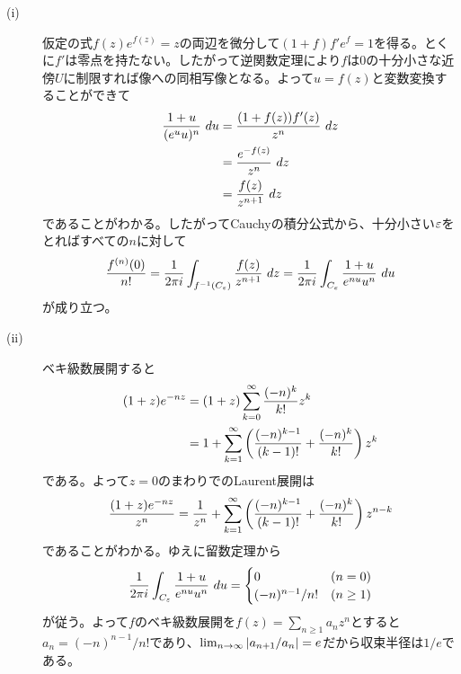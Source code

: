 \subsubsection{} %
\begin{sol} ${}$
  \begin{description}
    \item[(i)] 仮定の式$f(z)e^{f(z)} = z$の両辺を微分して$(1 + f)f' e^f = 1$を得る。とくに$f'$は零点を持たない。したがって逆関数定理により$f$は$0$の十分小さな近傍$U$に制限すれば像への同相写像となる。よって$u = f(z)$と変数変換することができて
    \begin{align*}
      \frac{1 + u}{ (e^u u)^n} \ du &= \frac{(1 + f(z))f'(z) }{z^n} \ dz \\
      &= \frac{ e^{-f(z)} }{z^n} \ dz \\
      &= \frac{f(z)}{z^{n+1}} \ dz
    \end{align*}
    であることがわかる。したがってCauchyの積分公式から、十分小さい${\varepsilon}$をとればすべての$n$に対して
    \[
\frac{ f^{(n)}(0) }{ n!} =  \frac{1}{2\pi i} \int_{f^{-1}(C_{{\varepsilon}})} \frac{f(z)}{z^{n+1}} \ dz  = \frac{1}{2\pi i} \int_{C_{{\varepsilon}}} \frac{1+u}{e^{nu} u^n} \ du
    \]
    が成り立つ。
    \item[(ii)] ベキ級数展開すると
    \begin{align*}
      (1 + z)e^{-nz} &= (1 + z) \sum_{k=0}^{\infty} \frac{ (-n)^k }{k!} z^k \\
      &= 1 + \sum_{k=1}^{\infty} \left( \frac{ (-n)^{k-1} }{ (k-1)! } + \frac{ (-n)^k }{k!} \right) z^{k}
    \end{align*}
    である。よって$z=0$のまわりでのLaurent展開は
    \[
    \frac{ (1 + z)e^{-nz} }{z^n} = \frac{1}{z^n} + \sum_{k=1}^{\infty} \left( \frac{ (-n)^{k-1} }{ (k-1)! } + \frac{ (-n)^k }{k!} \right) z^{n-k}
    \]
    であることがわかる。ゆえに留数定理から
    \[
    \frac{1}{2\pi i} \int_{C_{{\varepsilon}}} \frac{1+u}{e^{nu} u^n} \ du = \begin{cases}
    0 &(n=0) \\
    (-n)^{n-1}/ n! &(n \geq 1)
  \end{cases}
    \]
    が従う。よって$f$のベキ級数展開を$f(z) = \sum_{n \geq 1} a_n z^n$とすると$a_n=(-n)^{n-1}/n!$であり、$\lim_{n \to \infty} \left \lvert a_{n+1} / a_n \right \rvert = e$だから収束半径は$1/e$である。
  \end{description}
\end{sol}

